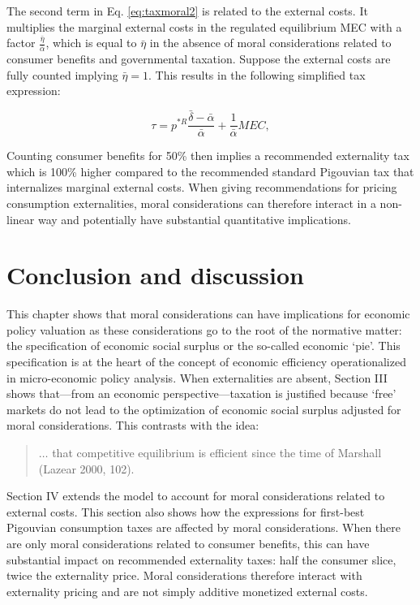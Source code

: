 \documentclass[
]{book}
\begin{document}
The second term in Eq. \eqref{eq:taxmoral2} is related to the external costs. It multiplies the marginal external costs in the regulated equilibrium MEC with a factor \(\frac{\bar{\eta}}{\bar{\alpha}}\), which is equal to \(\bar{\eta}\) in the absence of moral considerations related to consumer benefits and governmental taxation. Suppose the external costs are fully counted implying \(\bar{\eta} = 1\). This results in the following simplified tax expression:

\begin{equation}
 \tau = p^{*R} \frac{\bar{\delta} - \bar{\alpha}}{\bar{\alpha}} + \frac{1}{\bar{\alpha}}MEC,
   \label{eq:taxmoral3}
\end{equation}

Counting consumer benefits for 50\% then implies a recommended externality tax which is 100\% higher compared to the recommended standard Pigouvian tax that internalizes marginal external costs. When giving recommendations for pricing consumption externalities, moral considerations can therefore interact in a non-linear way and potentially have substantial quantitative implications.

\hypertarget{conclusion-and-discussion}{%
\section{Conclusion and discussion}\label{conclusion-and-discussion}}

This chapter shows that moral considerations can have implications for economic policy valuation as these considerations go to the root of the normative matter: the specification of economic social surplus or the so-called economic `pie'. This specification is at the heart of the concept of economic efficiency operationalized in micro-economic policy analysis. When externalities are absent, Section III shows that---from an economic perspective---taxation is justified because `free' markets do not lead to the optimization of economic social surplus adjusted for moral considerations. This contrasts with the idea:

\begin{quote}
\(\ldots\) that competitive equilibrium is efficient since the time of Marshall (Lazear 2000, 102).
\end{quote}

Section IV extends the model to account for moral considerations related to external costs. This section also shows how the expressions for first-best Pigouvian consumption taxes are affected by moral considerations. When there are only moral considerations related to consumer benefits, this can have substantial impact on recommended externality taxes: half the consumer slice, twice the externality price. Moral considerations therefore interact with externality pricing and are not simply additive monetized external costs.
\end{document}
